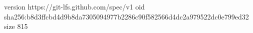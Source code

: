 version https://git-lfs.github.com/spec/v1
oid sha256:b8d3ffcbd4d9b8da7305094977b2286c90f582566d4dc2a979522dc0e799ed32
size 815
